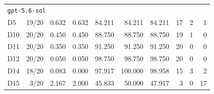 \documentclass{article} %
\begin{document}
\begin{table}[htbp]
{\begin{tabular}{@{}lrrrrrrrrr@{}}
	\midrule
	\multicolumn{10}{l}{\texttt{gpt-5.6-sol}} \\
	D5 & 19/20 & 0.632 & 0.632 & 84.211 & 84.211 & 84.211 & 17 & 2 & 1 \\
	D10 & 20/20 & 0.450 & 0.450 & 88.750 & 88.750 & 88.750 & 19 & 1 & 0 \\
	D11 & 20/20 & 0.350 & 0.350 & 91.250 & 91.250 & 91.250 & 20 & 0 & 0 \\
	D12 & 20/20 & 0.050 & 0.050 & 98.750 & 98.750 & 98.750 & 20 & 0 & 0 \\
	D14 & 18/20 & 0.083 & 0.000 & 97.917 & 100.000 & 98.958 & 15 & 3 & 2 \\
	D15 & 3/20 & 2.167 & 2.000 & 45.833 & 50.000 & 47.917 & 3 & 0 & 17 \\
	\bottomrule
	\end{tabular}%
	}
	\end{table}
\end{document}
